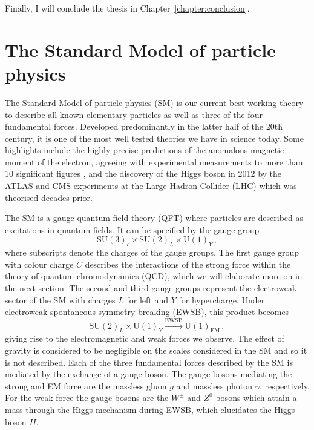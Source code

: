 \documentclass[main.tex]{subfiles}
\begin{document}
Finally, I will conclude the thesis in Chapter~\ref{chapter:conclusion}.

\section{The Standard Model of particle physics}
    The Standard Model of particle physics (SM) is our current
    best working theory to describe all known elementary particles
    as well as three of the four fundamental forces. Developed
    predominantly in the latter half of the 20th century, it is
    one of the most well tested theories we have in science today.
    Some highlights include the highly precise predictions of the
    anomalous magnetic moment of the electron, agreeing with experimental
    measurements to more than 10 significant figures \cite{Aoyama:2017uqe},
    and the discovery of the Higgs boson in 2012 by the ATLAS \cite{ATLAS:2012yve}
    and CMS experiments \cite{CMS:2012qbp} at the Large Hadron Collider
    (LHC) which was theorised decades prior.

    The SM is a gauge quantum field theory (QFT) where particles
    are described as excitations in quantum fields. It can be specified
    by the gauge group
    \begin{equation}\label{eqn:SM_gauge}
        \mathrm{SU}(3)_{c} \times \mathrm{SU}(2)_{L} \times \mathrm{U}(1)_{Y}\, ,
    \end{equation}
    where subscripts denote the charges of the gauge groups. The first gauge
    group with colour charge $C$ describes the interactions of the
    strong force within the theory of quantum chromodynamics (QCD), which we
    will elaborate more on in the next section. The second
    and third gauge groups represent the electroweak sector of the SM with
    charges $L$ for left and $Y$ for hypercharge. Under electroweak
    spontaneous symmetry breaking (EWSB), this product becomes
    \begin{equation}\label{eqn:SM_SSB}
        \mathrm{SU}(2)_{L} \times \mathrm{U}(1)_{Y} \xrightarrow{\mathrm{EWSB}} \mathrm{U}(1)_{\mathrm{EM}} \, ,
    \end{equation}
    giving rise to the electromagnetic and weak forces we observe.
    The effect of gravity is considered to be negligible on the scales
    considered in the SM and so it is not described.
    Each of the three fundamental forces described by the SM is mediated
    by the exchange of a gauge boson. The gauge bosons mediating the strong
    and EM force are the massless gluon $g$ and massless photon $\gamma$,
    respectively. For the weak force the gauge bosons are the $W^{\pm}$
    and $Z^{0}$ bosons which attain a mass through the Higgs mechanism \cite{Englert:1964et,Higgs:1964pj,Guralnik:1964eu}
    during EWSB, which elucidates the Higgs boson $H$.
\end{document}
